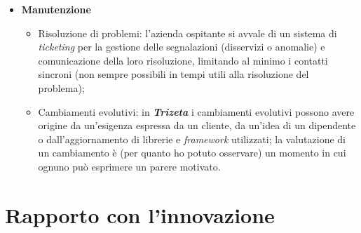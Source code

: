 \begin{itemize}
        {}
    \item \textbf{Manutenzione}
        \begin{itemize}
            \item Risoluzione di problemi: l'azienda ospitante si avvale di un sistema di \textit{ticketing} per la gestione delle segnalazioni (disservizi o anomalie) e comunicazione
                della loro risoluzione, limitando al minimo i contatti sincroni (non sempre possibili in tempi utili alla risoluzione del problema);
            \item Cambiamenti evolutivi: in \textit{\textbf{Trizeta}} i cambiamenti evolutivi possono avere origine da un'esigenza espressa da un cliente, da un'idea di un dipendente o dall'aggiornamento di librerie e \textit{framework} utilizzati; 
                la valutazione di un cambiamento è (per quanto ho potuto osservare) un momento in cui ognuno può esprimere un parere motivato. 
        \end{itemize}
\end{itemize}


\section{Rapporto con l'innovazione}
\label{sec:innovazione}

